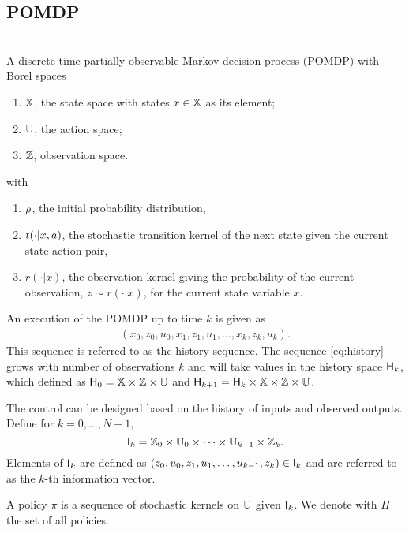 \documentclass{ifacconf}
\begin{document}
\subsection{POMDP}\label{sec:POMDP}
\begin{definition} \label{def:MDP}\mbox{ }\\
A discrete-time partially observable Markov decision process (POMDP) with Borel spaces
\begin{enumerate}
	\item ${\mathbb{X}}$, the state space with states $x\in{\mathbb{X}}$ as its element;
	\item ${\mathbb{U}}$, the action space;
	\item ${\mathbb{Z}}$, observation space.
\end{enumerate}
with 
\begin{enumerate}
\item $\rho$, the initial probability distribution,
\item $t(\cdot|x,a)$, the stochastic transition kernel of the next state given the current state-action pair,
\item $r(\cdot|x)$,  the observation kernel giving the probability of the current observation,  $z\sim r(\cdot|x)$,  for the current state variable $x$.
\end{enumerate}


\end{definition} 

An execution of the POMDP  up to time $k$ is given as
\begin{align}\label{eq:history} (x_0,z_0,u_0,x_1,z_1,u_1,\ldots,x_k,z_k,u_k).\end{align}
This sequence is referred to as the history sequence.
The sequence  \eqref{eq:history} grows with number of observations  $k$ and will take values in the history space ${\mathsf{H}}_k$, which defined as
${\mathsf{H}}_0={\mathbb{X}}\times{\mathbb{Z}}\times {\mathbb{U}}$ and ${\mathsf{H}}_{k+1}={\mathsf{H}}_{k}\times{\mathbb{X}}\times{\mathbb{Z}}\times {\mathbb{U}}$.


The control can be designed based on the history of inputs and observed outputs.  
Define for $k=0,\ldots,N-1,$ 
\[{\mathsf{I}}_k={\mathbb{Z}}_0\times{\mathbb{U}}_0\times\dots\times{\mathbb{U}}_{k-1}\times{\mathbb{Z}}_k.\]
Elements of ${\mathsf{I}}_k$ are defined as $(z_0,u_0,z_1,u_1,\ldots,u_{k-1},z_k)\in{\mathsf{I}}_k$ and are referred to as the $k$-th information vector. 
 

 A policy $\pi$ is a sequence of stochastic kernels on ${\mathbb{U}}$ given ${\mathsf{I}}_k$. 
We denote with $\Pi$ the set of all policies.
\citep[Def. 10.4]{bertsekas2004stochastic}  
\end{document}

